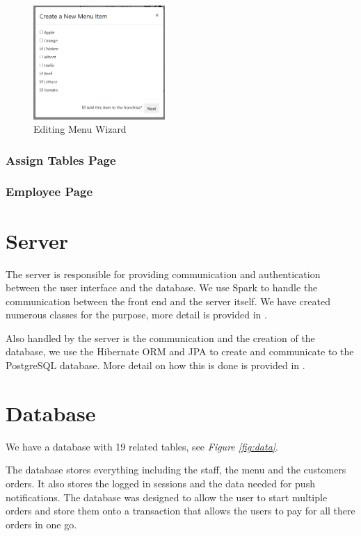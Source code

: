 \documentclass[12pt, twoside, a4paper]{report}
\begin{document}
\begin{figure}[H]
  \centering
  \includegraphics[width=5cm]{editWizard3.png}
  \caption{Editing Menu Wizard}
  \label{fig:editWizard3}
\end{figure}

\subsubsection*{Assign Tables Page}

\subsubsection*{Employee Page}

\section*{Server}
The server is responsible for providing communication and authentication between the user interface and the database.
We use Spark to handle the communication between the front end and the server itself. We have created numerous classes for the purpose, more detail is provided in \textit{}.

Also handled by the server is the communication and the creation of the database, we use the Hibernate ORM and JPA to create and communicate to the PostgreSQL database. More detail on how this is done is provided in \textit{}.

\section*{Database}

We have a database with 19 related tables, see \textit{Figure \ref{fig:data}}. 

The database stores everything including the staff, the menu and the customers orders. 
It also stores the logged in sessions and the data needed for push notifications.
The database was designed to allow the user to start multiple orders and store them onto a transaction that allows the users to pay for all there orders in one go.
\end{document}
